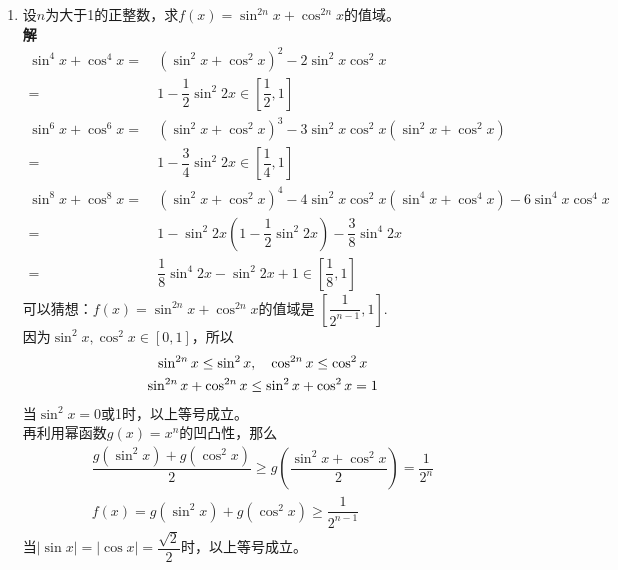 \begin{enumerate}[label={【\textbf{例\thechapter.\arabic*}】},
 leftmargin=\inteval{\myenumleftmargin}pt,
 itemsep=\inteval{\myenumitempsep}pt,
 itemindent=\inteval{\myenumitemindent}pt]
\item 设$ n $为大于1的正整数，求$ f(x)=\sin^{2n}x+\cos^{2n}x $的值域。\\
\textbf{解}\ 
\begin{align*}
    \sin^{4}x+\cos^{4}x =&\ (\sin^{2}x+\cos^{2}x)^2-2\sin^{2}x\cos^{2}x\\
    =&\ 1-\dfrac{1}{2}\sin^2 2x\in\left[\dfrac{1}{2},1\right] \\
    \sin^{6}x+\cos^{6}x =&\ (\sin^{2}x+\cos^{2}x)^3
    -3\sin^{2}x\cos^{2}x (\sin^{2}x+\cos^{2}x) \\
    =&\ 1-\dfrac{3}{4}\sin^2 2x\in\left[\dfrac{1}{4},1\right] \\
    \sin^{8}x+\cos^{8}x =&\ (\sin^{2}x+\cos^{2}x)^4
    -4\sin^{2}x\cos^{2}x (\sin^{4}x+\cos^{4}x)-6\sin^{4}x\cos^{4}x\\
    =&\ 1-\sin^2 2x\left(1-\dfrac{1}{2}\sin^2 2x\right)
    -\dfrac{3}{8}\sin^4 2x \\
    =&\ \dfrac{1}{8}\sin^4 2x-\sin^2 2x+1 
    \in\left[\dfrac{1}{8},1\right]
\end{align*}
可以猜想：$ f(x)=\sin^{2n}x+\cos^{2n}x $的值域是
$ \left[\dfrac{1}{2^{n-1}},1\right] $. \\
因为$ \sin^2 x,\cos^2 x\in[0,1] $，所以
\begin{gather*}
    \sin^{2n}x\leq \sin^2 x ,\quad \cos^{2n}x\leq \cos^2 x  \\ \sin^{2n}x+\cos^{2n}x\leq \sin^{2}x+\cos^{2}x=1
\end{gather*}
当$ \sin^2 x=0 $或1时，以上等号成立。\\
再利用幂函数$ g(x)=x^n $的凹凸性，那么
\begin{gather*}
    \dfrac{g(\sin^2 x)+g(\cos^2 x)}{2}\geq g\left(
    \dfrac{\sin^2 x+\cos^2 x}{2}\right)=\dfrac{1}{2^n} \\
    f(x)=g(\sin^2 x)+g(\cos^2 x)\geq \dfrac{1}{2^{n-1}}
\end{gather*}
当$ |\sin x|=|\cos x|=\dfrac{\sqrt{2}}{2} $时，以上等号成立。


\end{enumerate}
